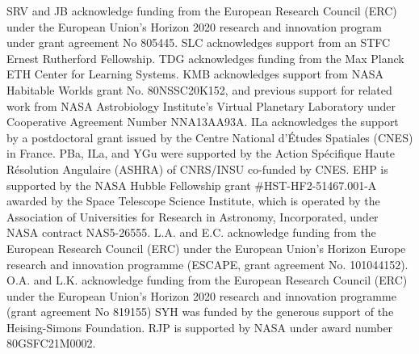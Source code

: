 \documentclass[usenatbib]{mnras}
\begin{document}
SRV and JB acknowledge funding from the European Research Council (ERC) under the European Union’s Horizon 2020 research and innovation program under grant agreement No 805445.
SLC acknowledges support from an STFC Ernest Rutherford Fellowship. 
TDG acknowledges funding from the Max Planck ETH Center for Learning Systems.
KMB acknowledges support from NASA Habitable Worlds grant No. 80NSSC20K152, and previous support for related work from NASA Astrobiology Institute's Virtual Planetary Laboratory under Cooperative Agreement Number NNA13AA93A.
ILa acknowledges the support by a postdoctoral grant issued by the Centre National d'Études Spatiales (CNES) in France.
PBa, ILa, and YGu were supported by the Action Spécifique Haute Résolution Angulaire (ASHRA) of CNRS/INSU co-funded by CNES.
EHP is supported by the NASA Hubble Fellowship grant \#HST-HF2-51467.001-A awarded by the Space Telescope Science Institute, which is operated by the Association of Universities for Research in Astronomy, Incorporated, under NASA contract NAS5-26555.
L.A. and E.C. acknowledge funding from the European Research Council (ERC) under the European Union's Horizon Europe research and innovation programme (ESCAPE, grant agreement No. 101044152).
O.A. and L.K. acknowledge funding from the European Research Council (ERC) under the European Union’s Horizon 2020 research and innovation programme (grant agreement No 819155)
SYH was funded by the generous support of the Heising-Simons Foundation.
RJP is supported by NASA under award number 80GSFC21M0002.












\end{document}
